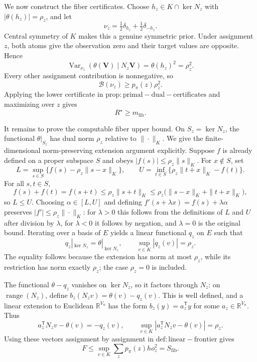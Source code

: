 We now construct the fiber certificates. Choose \(h_z\in K\cap\ker N_z\) with \(|\theta(h_z)|=\rho_z\), and let
\[
 \nu_z=\tfrac12\delta_{h_z}+\tfrac12\delta_{-h_z}.
\]
Central symmetry of \(K\) makes this a genuine symmetric prior. Under assignment \(z\), both atoms give the observation zero and their target values are opposite. Hence
\[
 \operatorname{Var}_{\nu_z}(\theta(\mathbf V)\mid N_z\mathbf V)
 =\theta(h_z)^2=\rho_z^2.
\]
Every other assignment contribution is nonnegative, so
\[
 \mathcal B(\nu_z)\ge p_{\pi}(z)\rho_z^2.
\]
Applying the lower certificate in \(\mathrm{prop:primal-dual-certificates}\) and maximizing over \(z\) gives
\[
 R^{\star}\ge m_{\mathrm{fib}}.
\]

It remains to prove the computable fiber upper bound. On \(S_z=\ker N_z\), the functional \(\theta|_{S_z}\) has dual norm \(\rho_z\) relative to \(\|\cdot\|_K\). We give the finite-dimensional norm-preserving extension argument explicitly. Suppose \(f\) is already defined on a proper subspace \(S\) and obeys \(|f(s)|\le\rho_z\|s\|_K\). For \(x\notin S\), set
\[
 L=\sup_{s\in S}\{f(s)-\rho_z\|s-x\|_K\},
 \qquad
 U=\inf_{t\in S}\{\rho_z\|t+x\|_K-f(t)\}.
\]
For all \(s,t\in S\),
\[
 f(s)+f(t)=f(s+t)
 \le\rho_z\|s+t\|_K
 \le\rho_z\bigl(\|s-x\|_K+\|t+x\|_K\bigr),
\]
so \(L\le U\). Choosing \(\alpha\in[L,U]\) and defining
\(
f'(s+\lambda x)=f(s)+\lambda\alpha
\)
preserves \(|f'|\le\rho_z\|\cdot\|_K\): for \(\lambda>0\) this follows from the definitions of \(L\) and \(U\) after division by \(\lambda\), for \(\lambda<0\) it follows by negation, and \(\lambda=0\) is the original bound. Iterating over a basis of \(E\) yields a linear functional \(q_z\) on \(E\) such that
\[
 q_z|_{\ker N_z}=\theta|_{\ker N_z},
 \qquad
 \sup_{v\in K}|q_z(v)|=\rho_z.
\]
The equality follows because the extension has norm at most \(\rho_z\), while its restriction has norm exactly \(\rho_z\); the case \(\rho_z=0\) is included.

The functional \(\theta-q_z\) vanishes on \(\ker N_z\), so it factors through \(N_z\): on \(\operatorname{range}(N_z)\), define \(b_z(N_zv)=\theta(v)-q_z(v)\). This is well defined, and a linear extension to Euclidean \(\mathbb R^{V_n}\) has the form \(b_z(y)=a_z^{\mathsf T}y\) for some \(a_z\in\mathbb R^{V_n}\). Thus
\[
 a_z^{\mathsf T}N_zv-\theta(v)=-q_z(v),
 \qquad
 \sup_{v\in K}|a_z^{\mathsf T}N_zv-\theta(v)|=\rho_z.
\]
Using these vectors assignment by assignment in \(\mathrm{def:linear-frontier}\) gives
\[
 F\le\sup_{v\in K}\sum_zp_{\pi}(z)
ho_z^2
 =S_{\mathrm{fib}}.
\]

